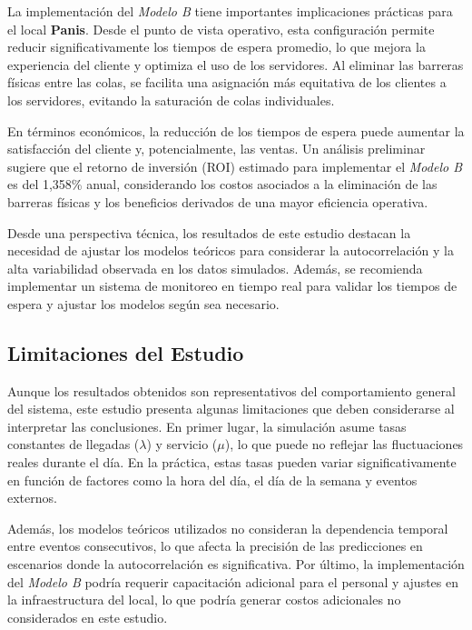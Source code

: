 \documentclass[a4paper,12pt]{article}
\begin{document}
La implementación del \textit{Modelo B} tiene importantes implicaciones prácticas para el local \textbf{Panis}. Desde el punto de vista operativo, esta configuración permite reducir significativamente los tiempos de espera promedio, lo que mejora la experiencia del cliente y optimiza el uso de los servidores. Al eliminar las barreras físicas entre las colas, se facilita una asignación más equitativa de los clientes a los servidores, evitando la saturación de colas individuales.

En términos económicos, la reducción de los tiempos de espera puede aumentar la satisfacción del cliente y, potencialmente, las ventas. Un análisis preliminar sugiere que el retorno de inversión (ROI) estimado para implementar el \textit{Modelo B} es del 1,358\% anual, considerando los costos asociados a la eliminación de las barreras físicas y los beneficios derivados de una mayor eficiencia operativa.

Desde una perspectiva técnica, los resultados de este estudio destacan la necesidad de ajustar los modelos teóricos para considerar la autocorrelación y la alta variabilidad observada en los datos simulados. Además, se recomienda implementar un sistema de monitoreo en tiempo real para validar los tiempos de espera y ajustar los modelos según sea necesario.

\subsection{Limitaciones del Estudio}

Aunque los resultados obtenidos son representativos del comportamiento general del sistema, este estudio presenta algunas limitaciones que deben considerarse al interpretar las conclusiones. En primer lugar, la simulación asume tasas constantes de llegadas (\( \lambda \)) y servicio (\( \mu \)), lo que puede no reflejar las fluctuaciones reales durante el día. En la práctica, estas tasas pueden variar significativamente en función de factores como la hora del día, el día de la semana y eventos externos.

Además, los modelos teóricos utilizados no consideran la dependencia temporal entre eventos consecutivos, lo que afecta la precisión de las predicciones en escenarios donde la autocorrelación es significativa. Por último, la implementación del \textit{Modelo B} podría requerir capacitación adicional para el personal y ajustes en la infraestructura del local, lo que podría generar costos adicionales no considerados en este estudio.
\end{document}
